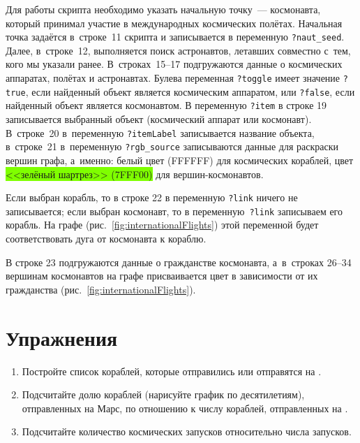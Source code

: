 Для работы скрипта необходимо указать начальную точку~--- космонавта, 
который принимал участие в международных космических полётах. 
Начальная точка задаётся в~строке~11 скрипта и записывается в переменную \lstinline|?naut_seed|. 
Далее, в~строке~12, выполняется поиск астронавтов, 
летавших совместно с~тем, кого мы указали ранее. 
В~строках~15--17 подгружаются данные о космических аппаратах, полётах и астронавтах. 
Булева переменная \lstinline|?toggle| имеет значение \lstinline|?true|, 
если найденный объект является космическим аппаратом, 
или \lstinline|?false|, 
если найденный объект является космонавтом. 
В переменную \lstinline|?item| в строке 19 записывается выбранный объект (космический аппарат или космонавт). 
В~строке~20 в~переменную \lstinline|?itemLabel| записывается название объекта, 
в~строке~21 в~переменную \lstinline|?rgb_source| записываются 
данные для раскраски вершин графа, а~именно: 
белый цвет (FFFFFF) для космических кораблей, 
цвет \colorbox{chartreuse}{<<зелёный шартрез>> (7FFF00)} для вершин-космонавтов. 


Если выбран корабль, то в строке 22 в переменную \lstinline|?link| ничего не записывается; 
если выбран космонавт, то в переменную~\lstinline|?link| записываем его корабль. 
На графе (рис.~\ref{fig:internationalFlights}) этой переменной будет соответствовать дуга от космонавта к кораблю. 

В строке 23 подгружаются данные о гражданстве космонавта, 
а~в~строках 26--34 вершинам космонавтов на графе присваивается цвет в зависимости от их гражданства (рис.~\ref{fig:internationalFlights}). 





\section{Упражнения}
\begin{enumerate}
  \item Постройте список кораблей, которые отправились или отправятся на .
  \item Подсчитайте долю кораблей (нарисуйте график по десятилетиям), 
      отправленных на Марс, 
      по отношению к числу кораблей, отправленных на .
  \item Подсчитайте количество  космических запусков 
      относительно числа
       запусков.%
\end{enumerate}




